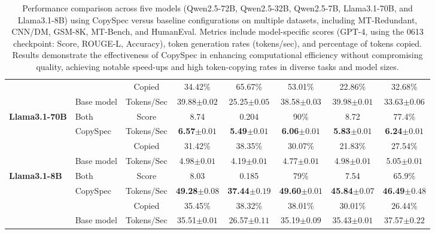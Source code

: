\begin{table*}[h!]
{\begin{tabular}{l l c c c c c c}
            &          & Copied  & 34.42\% & 65.67\% & 53.01\% & 22.86\% & 32.68\% \\
            & Base model & Tokens/Sec & 39.88$\pm0.02$ & 25.25$\pm0.05$ & 38.58$\pm0.03$ & 39.98$\pm0.01$ & 33.63$\pm0.06$ \\
\midrule
\multirow{4}{*}{\textbf{Llama3.1-70B}} & Both & Score & 8.74 & 0.204 & 90\% & 8.72 & 77.4\% \\
\cmidrule(lr){2-8}
            & CopySpec & Tokens/Sec & \textbf{6.57}$\pm0.01$ & \textbf{5.49}$\pm0.01$ & \textbf{6.06}$\pm0.01$ & \textbf{5.83}$\pm0.01$ & \textbf{6.24}$\pm0.01$ \\
            &          & Copied  & 31.42\% & 38.35\% & 30.07\% & 21.83\% & 27.54\% \\
            & Base model & Tokens/Sec & 4.98$\pm0.01$ & 4.19$\pm0.01$ & 4.77$\pm0.01$ & 4.98$\pm0.01$ & 5.05$\pm0.01$ \\
\midrule
\multirow{4}{*}{\textbf{Llama3.1-8B}} & Both & Score & 8.03 & 0.185 & 79\% & 7.54 & 65.9\% \\
\cmidrule(lr){2-8}
            & CopySpec & Tokens/Sec & \textbf{49.28}$\pm0.08$ & \textbf{37.44}$\pm0.19$ & \textbf{49.60}$\pm0.01$ & \textbf{45.84}$\pm0.07$ & \textbf{46.49}$\pm0.48$ \\
            &          & Copied  & 35.45\% & 38.32\% & 38.01\% & 30.01\% & 26.44\% \\
            & Base model & Tokens/Sec & 35.51$\pm0.01$ & 26.57$\pm0.11$ & 35.19$\pm0.09$ & 35.43$\pm0.01$ & 37.57$\pm0.22$ \\
\midrule
\bottomrule
\end{tabular}
}
\caption{Performance comparison across five models (Qwen2.5-72B, Qwen2.5-32B, Qwen2.5-7B, Llama3.1-70B, and Llama3.1-8B) using CopySpec versus baseline configurations on multiple datasets, including MT-Redundant, CNN/DM, GSM-8K, MT-Bench, and HumanEval. Metrics include model-specific scores 
(GPT-4, using the 0613 checkpoint: Score, ROUGE-L, Accuracy), token generation rates (tokens/sec), and percentage of tokens copied. Results demonstrate the effectiveness of CopySpec in enhancing computational efficiency without compromising quality, achieving notable speed-ups and high token-copying rates in diverse tasks and model sizes.}

\label{tab:performance}
\end{table*}



